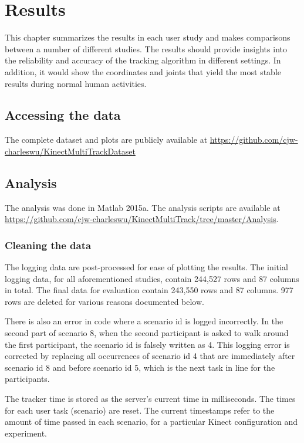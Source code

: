 


\chapter{Results}
\label{chapter:results}

This chapter summarizes the results in each user study and makes comparisons between a number of different studies. The results should provide insights into the reliability and accuracy of the tracking algorithm in different settings. In addition, it would show the coordinates and joints that yield the most stable results during normal human activities.

\section{Accessing the data}
\label{sec:results_access_data}

The complete dataset and plots are publicly available at \url{https://github.com/cjw-charleswu/KinectMultiTrackDataset}

\section{Analysis}
\label{sec:results_analysis}

The analysis was done in Matlab 2015a. The analysis scripts are available at \url{https://github.com/cjw-charleswu/KinectMultiTrack/tree/master/Analysis}.

\subsection{Cleaning the data}
The logging data are post-processed for ease of plotting the results. The initial logging data, for all aforementioned studies, contain 244,527 rows and 87 columns in total. The final data for evaluation contain 243,550 rows and 87 columns. 977 rows are deleted for various reasons documented below.

There is also an error in code where a scenario id is logged incorrectly. In the second part of scenario 8, when the second participant is asked to walk around the first participant, the scenario id is falsely written as 4. This logging error is corrected by replacing all occurrences of scenario id 4 that are immediately after scenario id 8 and before scenario id 5, which is the next task in line for the participants.

The tracker time is stored as the server's current time in milliseconds. The times for each user task (scenario) are reset. The current timestamps refer to the amount of time passed in each scenario, for a particular Kinect configuration and experiment.

